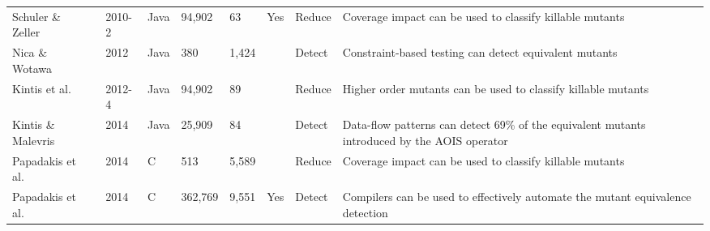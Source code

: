 \begin{table*}[ht]
\begin{tabular}{lllllllp{4cm}}
Schuler \& Zeller~\cite{schuler2010covering,schuler2013covering} & 2010-2 & Java     & 94,902                                                     & 63                                                       & Yes                                                       & Reduce                                                   & Coverage impact can be used to classify killable mutants                                      \\
Nica \& Wotawa~\cite{nica2012using}    & 2012   & Java     & 380                                                       & 1,424                                                     &                                                           & Detect                                                   & Constraint-based testing can detect equivalent mutants                                        \\
Kintis et al.~\cite{kintis2012isolating,kintis2015employing}     & 2012-4 & Java     & 94,902                                                     & 89                                                       &                                                           & Reduce                                                   & Higher order mutants can be used to classify killable mutants                                 \\
Kintis \& Malevris~\cite{kintis2014using} & 2014   & Java     & 25,909                                                     & 84                                                       &                                                           & Detect                                                   & Data-flow patterns can detect 69\% of the equivalent mutants introduced by the AOIS operator  \\
Papadakis et al.~\cite{papadakis2014mitigating}    & 2014   & C        & 513                                                       & 5,589                                                     &                                                           & Reduce                                                   & Coverage impact can be used to classify killable mutants                                      \\
Papadakis et al.~\cite{papadakis2015trivial}    & 2014   & C        & 362,769                                                    & 9,551                                                     & Yes                                                       & Detect                                                   & Compilers can be used to effectively automate the mutant equivalence detection               \\
\bottomrule
\end{tabular}
\end{table*}

